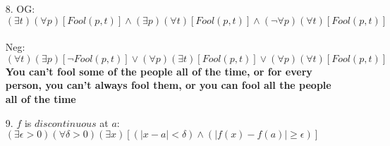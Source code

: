 \documentclass[11pt]{exam}
\begin{document}
\begin{enumerate}[leftmargin=0pt]
\item[8.]
OG: $(\exists t)(\forall p)[Fool(p,t)] \land (\exists p)(\forall t)[Fool(p,t)] \land (\neg \forall p)(\forall t)[Fool(p,t)]$ \\
\\
Neg: $(\forall t)(\exists p)[\neg Fool(p,t)] \lor (\forall p)(\exists t)[Fool(p,t)] \lor (\forall p)(\forall t)[Fool(p,t)]$ \\
\textbf{You can't fool some of the people all of the time, or for every person, you can't always fool them, or you can fool all the people all of the time}

\item[9.] $f$ is $discontinuous$ at $a$: $(\exists \epsilon > 0)(\forall \delta > 0)(\exists x)[(|x - a| < \delta) \land (|f(x) - f(a)| \geq \epsilon)]$


\end{enumerate}
\end{document}
